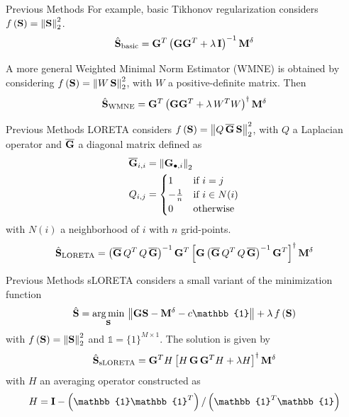 \documentclass[progressbar=head]{beamer}
\begin{document}
\begin{frame}{Previous Methods}
    For example, basic Tikhonov regularization considers $f\left( \mathbf{S} \right) = \left\lVert \mathbf{S} \right\rVert_2^2$.
\begin{equation}
    \hat{\mathbf{S}}_{\text{basic}}
    =
    \mathbf{G}^T \left( \mathbf{G} \mathbf{G}^T + \lambda\, \mathbf{I} \right)^{-1} \mathbf{M}^\delta
\end{equation}

A more general Weighted Minimal Norm Estimator (WMNE) is obtained by considering
$f\left( \mathbf{S} \right) = \left\lVert W\, \mathbf{S} \right\rVert_2^2$, with $W$ a positive-definite matrix. Then
\begin{equation}
    \hat{\mathbf{S}}_{\text{WMNE}}
    =
    \mathbf{G}^T \left( \mathbf{G} \mathbf{G}^T + \lambda\, W^T W \right)^{\dagger} \mathbf{M}^\delta
\end{equation}
\end{frame}

\begin{frame}{Previous Methods}
LORETA\cite{loreta}  considers 
$f\left( \mathbf{S} \right) = \left\lVert Q\,\overline{\mathbf{G}}\, \mathbf{S} \right\rVert_2^2$, with $Q$ 
a Laplacian operator and $\overline{\mathbf{G}}$ 
a diagonal matrix
defined as
\begin{align*}
    \overline{\mathbf{G}}_{i,i} &= \left\lVert \mathbf{G}_{\bullet,i} \right\rVert_2 \\
    Q_{i,j} &=
    \begin{cases}
        1 &\text{if } i=j \\
        -\frac{1}{n} &\text{if } i\in N(i) \\
        0 &\text{otherwise}
    \end{cases}
\end{align*}
with $N(i)$ a neighborhood of $i$ with $n$ grid-points.
%
\begin{equation}
    \hat{\mathbf{S}}_{\text{LORETA}}
    =
    \left( \overline{\mathbf{G}}\, Q^T\, Q\,  \overline{\mathbf{G}} \right)^{-1} \mathbf{G}^T
    \left[ \mathbf{G} \left( \overline{\mathbf{G}}\, Q^T\, Q\,  \overline{\mathbf{G}} \right)^{-1} \mathbf{G}^T \right]^{\dagger} 
    \mathbf{M}^\delta
\end{equation}
\end{frame}

\begin{frame}{Previous Methods}
sLORETA\cite{sloreta}  considers a small variant of the minimization function
\begin{equation}
    \hat{\mathbf{S}} = \argmin_{\mathbf{S}}\, \nnorm{\G \mathbf{S}-\mathbf{M}^\delta-c \mathbb{1}} + \lambda\, f\ppar{\mathbf{S}}
\end{equation}
with $f\left( \mathbf{S} \right) = \left\lVert \mathbf{S} \right\rVert_2^2$ and 
$\mathbb{1}=\{1\}^{M\times 1}$.
The solution is given by
\begin{equation}
    \hat{\mathbf{S}}_{\text{sLORETA}}
    =
    \mathbf{G}^T H\left[ H\, \mathbf{G}\, \mathbf{G}^T H+ \lambda H \right]^{\dagger}
    \mathbf{M}^\delta
\end{equation}
with $H$ an averaging operator constructed as
\begin{equation*}
    H = \id - \ppar{\mathbb{1} \mathbb{1}^T}/\ppar{\mathbb{1}^T \mathbb{1}}
\end{equation*}

\end{frame}
\end{document}
